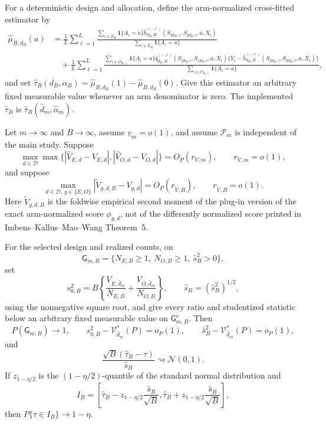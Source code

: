 For a deterministic design and allocation, define the arm-normalized cross-fitted estimator by
\[
\begin{aligned}
 \widehat\mu_{B,d_B}(a)
 &=\frac1L\sum_{\ell=1}^L
 \frac{\sum_{i\in E_B}\mathbf 1\{A_i=a\}
 \widehat h_{d_B,B}^{(-\ell)}(S_{3d_B,i},S_{2d_B,i},a,X_i)}
 {\sum_{i\in E_B}\mathbf 1\{A_i=a\}}\\
 &\quad+\frac1L\sum_{\ell=1}^L
 \frac{\sum_{i\in O_{B,\ell}}\mathbf 1\{A_i=a\}
 \widehat q_{d_B,B}^{(-\ell)}(S_{2d_B,i},S_{1d_B,i},a,X_i)
 \{Y_i-\widehat h_{d_B,B}^{(-\ell)}(S_{3d_B,i},S_{2d_B,i},a,X_i)\}}
 {\sum_{i\in O_{B,\ell}}\mathbf 1\{A_i=a\}},
\end{aligned}
\]
and set \(\widehat\tau_B(d_B,\alpha_B)=\widehat\mu_{B,d_B}(1)-\widehat\mu_{B,d_B}(0)\).  Give this estimator an arbitrary fixed measurable value whenever an arm denominator is zero.  The implemented \(\widehat\tau_B\) is \(\widehat\tau_B(\widehat d_m,\widehat\alpha_m)\).

Let \(m\to\infty\) and \(B\to\infty\), assume \(\underline v_m=o(1)\), and assume \(\mathcal P_m\) is independent of the main study.  Suppose
\[
 \max_{d\in\mathcal D}\max\{|\widehat V_{E,d}-V_{E,d}|,
 |\widehat V_{O,d}-V_{O,d}|\}=O_P(r_{V,m}),
 \qquad r_{V,m}=o(1),
\]
and suppose
\[
 \max_{d\in\mathcal D,\,g\in\{E,O\}}
 |\widetilde V_{g,d,B}-V_{g,d}|=O_P(r_{\widetilde V,B}),
 \qquad r_{\widetilde V,B}=o(1).
\]
Here \(\widetilde V_{g,d,B}\) is the foldwise empirical second moment of the plug-in version of the exact arm-normalized score \(\phi_{g,d}\), not of the differently normalized score printed in Imbens--Kallus--Mao--Wang Theorem~5.

For the selected design and realized counts, on
\[
 \mathsf G_{m,B}=\{N_{E,B}\ge1,\ N_{O,B}\ge1,\ \widehat s_B^2>0\},
\]
set
\[
 s_{0,B}^2=B\left\{\frac{V_{E,\widehat d_m}}{N_{E,B}}
 +\frac{V_{O,\widehat d_m}}{N_{O,B}}\right\},
 \qquad
 \widehat s_B=(\widehat s_B^2)^{1/2},
\]
using the nonnegative square root, and give every ratio and studentized statistic below an arbitrary fixed measurable value on \(\mathsf G_{m,B}^c\).  Then
\[
 P(\mathsf G_{m,B})\longrightarrow1,
 \qquad
 s_{0,B}^2-\mathcal V_{\widehat d_m}^*(P)=o_P(1),
 \qquad
 \widehat s_B^2-\mathcal V_{\widehat d_m}^*(P)=o_P(1),
\]
and
\[
 \frac{\sqrt B(\widehat\tau_B-\tau)}{\widehat s_B}
 \rightsquigarrow\mathcal N(0,1).
\]
If \(z_{1-\eta/2}\) is the \((1-\eta/2)\)-quantile of the standard normal distribution and
\[
 I_B=\left[
 \widehat\tau_B-z_{1-\eta/2}\frac{\widehat s_B}{\sqrt B},
 \widehat\tau_B+z_{1-\eta/2}\frac{\widehat s_B}{\sqrt B}
 \right],
\]
then \(P\{\tau\in I_B\}\to1-\eta\).